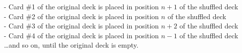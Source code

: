 \begin{itemize}
\begin{enumerate}
\smallskip

\noindent
- Card \#1 of the original deck is placed in position $n+1$ of the shuffled deck \\
- Card \#2 of the original deck is placed in position $n$ of the shuffled deck \\
- Card \#3 of the original deck is placed in position $n+2$ of the shuffled deck \\
- Card \#4 of the original deck is placed in position $n-1$ of the shuffled deck \\
\hspace*{.1in} \ldots and so on, until the original deck is empty.

\smallskip
{}
\end{enumerate}
\end{itemize}
